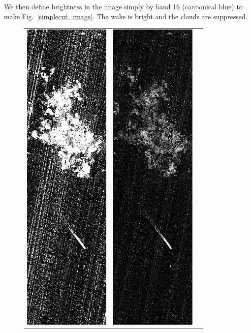 \documentclass[12pt]{article}
\begin{document}
We then define brightness in the image simply by band 16 (cannonical
blue) to make Fig.~\ref{simplecut_image}.  The wake is bright and the
clouds are suppressed.

\begin{figure}
\begin{center}
\begin{tabular}{c c c}
\includegraphics[width=0.28\linewidth]{likelihood_image.png} &
\includegraphics[width=0.28\linewidth]{likelihood_naivebayes_image.png} &

\end{tabular}
\end{center}
\end{figure}
\end{document}
